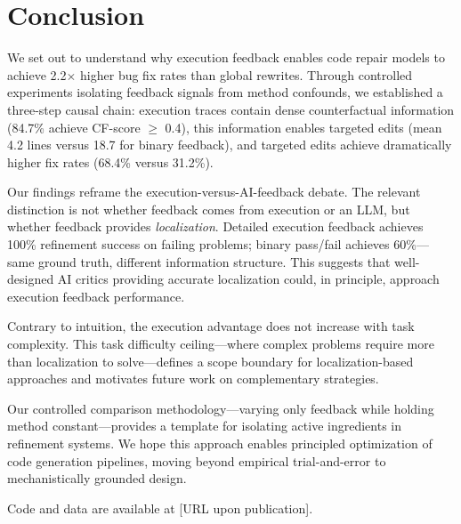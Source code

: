 \section{Conclusion}
\label{sec:conclusion}

We set out to understand why execution feedback enables code repair models to achieve 2.2$\times$ higher bug fix rates than global rewrites. Through controlled experiments isolating feedback signals from method confounds, we established a three-step causal chain: execution traces contain dense counterfactual information (84.7\% achieve CF-score $\geq$ 0.4), this information enables targeted edits (mean 4.2 lines versus 18.7 for binary feedback), and targeted edits achieve dramatically higher fix rates (68.4\% versus 31.2\%).

Our findings reframe the execution-versus-AI-feedback debate. The relevant distinction is not whether feedback comes from execution or an LLM, but whether feedback provides \emph{localization}. Detailed execution feedback achieves 100\% refinement success on failing problems; binary pass/fail achieves 60\%---same ground truth, different information structure. This suggests that well-designed AI critics providing accurate localization could, in principle, approach execution feedback performance.

Contrary to intuition, the execution advantage does not increase with task complexity. This task difficulty ceiling---where complex problems require more than localization to solve---defines a scope boundary for localization-based approaches and motivates future work on complementary strategies.

Our controlled comparison methodology---varying only feedback while holding method constant---provides a template for isolating active ingredients in refinement systems. We hope this approach enables principled optimization of code generation pipelines, moving beyond empirical trial-and-error to mechanistically grounded design.

Code and data are available at [URL upon publication].
